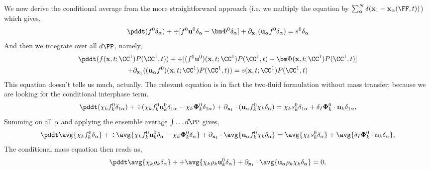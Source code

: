 We now derive the conditional average from the more straightforward approach (i.e. we multiply the equation by $\sum_\alpha^N \delta(\textbf{x}_1 - \textbf{x}_\alpha(\FF,t))$) which gives, 
\begin{equation*}
    \pddt (f^0\delta_\alpha)
    + \div 
    [f^0\textbf{u}^0\delta_\alpha
    - \bm\Phi^0\delta_\alpha]
    + \partial_{\textbf{x}_1}(\textbf{u}_\alpha f^0 \delta_\alpha)
    = s^0\delta_\alpha
\end{equation*}
And then we integrate over all $d\PP$, namely, 
\begin{multline*}
    \pddt (f(\textbf{x},t;\CC^1)P(\CC^1,t))
    + \div 
    [(f^0\textbf{u}^0)(\textbf{x},t;\CC^1)P(\CC^1,t)
    - \bm\Phi(\textbf{x},t;\CC^1)P(\CC^1,t)]\\
    + \partial_{\textbf{x}_1}((\textbf{u}_\alpha f^0)(\textbf{x},t;\CC^1)P(\CC^1,t))
    = s(\textbf{x},t;\CC^1)P(\CC^1,t)
\end{multline*}
This equation doesn't tells us much, actually. 
The relevant equation is in fact the two-fluid formulation without mass transfer; because we are looking for the conditional interphase term. 
\begin{equation*}
    \pddt (\chi_k f_k^0 \delta_{1\alpha})
    + \div (
        \chi_k f_k^0 \textbf{u}_k^0 \delta_{1\alpha}
        - \chi_k \mathbf{\Phi}_k^0  \delta_{1\alpha}
        )
    + \partial_{\textbf{x}_1}\cdot (\textbf{u}_\alpha f^0_k\chi_k\delta_\alpha)
    = 
    \chi_k s_k^0 \delta_{1\alpha}
    + \delta_I
         \mathbf{\Phi}_k^0
    \cdot \textbf{n}_k  \delta_{1\alpha},
\end{equation*}
Summing on all $\alpha$ and applying the ensemble average $\int\ldots d\PP$ gives, 
\begin{equation*}
    \pddt \avg{\chi_k f_k^0 \delta_{\alpha}}
    + \div 
        \avg{\chi_k f_k^0 \textbf{u}_k^0 \delta_{\alpha}
        - \chi_k \mathbf{\Phi}_k^0  \delta_{\alpha}}
    + \partial_{\textbf{x}_1}\cdot \avg{\textbf{u}_\alpha f^0_k\chi_k\delta_\alpha}
    = 
    \avg{\chi_k s_k^0 \delta_{\alpha}}
    + \avg{\delta_I
         \mathbf{\Phi}_k^0
    \cdot \textbf{n}_k  \delta_{\alpha}},
\end{equation*}
The conditional mass equation then reads as,  
\begin{equation*}
    \pddt \avg{\chi_k \rho_k \delta_{\alpha}}
    + \div 
        \avg{\chi_k \rho_k \textbf{u}_k^0 \delta_{\alpha}}
    + \partial_{\textbf{x}_1}\cdot \avg{\textbf{u}_\alpha \rho_k \chi_k\delta_\alpha}
    = 
    0,
\end{equation*}
